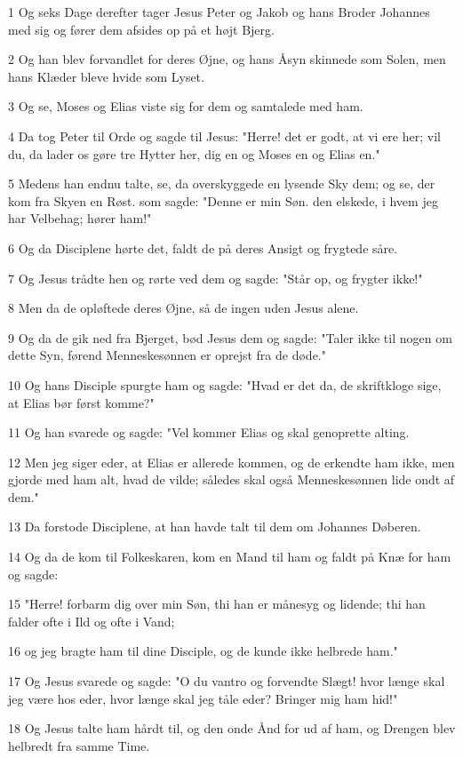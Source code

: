 \par 1 Og seks Dage derefter tager Jesus Peter og Jakob og hans Broder Johannes med sig og fører dem afsides op på et højt Bjerg.
\par 2 Og han blev forvandlet for deres Øjne, og hans Åsyn skinnede som Solen, men hans Klæder bleve hvide som Lyset.
\par 3 Og se, Moses og Elias viste sig for dem og samtalede med ham.
\par 4 Da tog Peter til Orde og sagde til Jesus: "Herre! det er godt, at vi ere her; vil du, da lader os gøre tre Hytter her, dig en og Moses en og Elias en."
\par 5 Medens han endnu talte, se, da overskyggede en lysende Sky dem; og se, der kom fra Skyen en Røst. som sagde: "Denne er min Søn. den elskede, i hvem jeg har Velbehag; hører ham!"
\par 6 Og da Disciplene hørte det, faldt de på deres Ansigt og frygtede såre.
\par 7 Og Jesus trådte hen og rørte ved dem og sagde: "Står op, og frygter ikke!"
\par 8 Men da de opløftede deres Øjne, så de ingen uden Jesus alene.
\par 9 Og da de gik ned fra Bjerget, bød Jesus dem og sagde: "Taler ikke til nogen om dette Syn, førend Menneskesønnen er oprejst fra de døde."
\par 10 Og hans Disciple spurgte ham og sagde: "Hvad er det da, de skriftkloge sige, at Elias bør først komme?"
\par 11 Og han svarede og sagde: "Vel kommer Elias og skal genoprette alting.
\par 12 Men jeg siger eder, at Elias er allerede kommen, og de erkendte ham ikke, men gjorde med ham alt, hvad de vilde; således skal også Menneskesønnen lide ondt af dem."
\par 13 Da forstode Disciplene, at han havde talt til dem om Johannes Døberen.
\par 14 Og da de kom til Folkeskaren, kom en Mand til ham og faldt på Knæ for ham og sagde:
\par 15 "Herre! forbarm dig over min Søn, thi han er månesyg og lidende; thi han falder ofte i Ild og ofte i Vand;
\par 16 og jeg bragte ham til dine Disciple, og de kunde ikke helbrede ham."
\par 17 Og Jesus svarede og sagde: "O du vantro og forvendte Slægt! hvor længe skal jeg være hos eder, hvor længe skal jeg tåle eder? Bringer mig ham hid!"
\par 18 Og Jesus talte ham hårdt til, og den onde Ånd for ud af ham, og Drengen blev helbredt fra samme Time.
